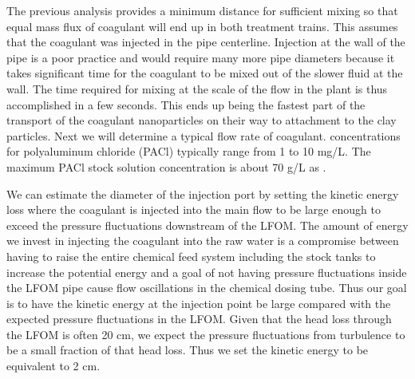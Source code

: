\documentclass[letterpaper,10pt,english]{sphinxmanual}
\begin{document}
The previous analysis provides a minimum distance for sufficient mixing so that equal mass flux of coagulant will end up in both treatment trains. This assumes that the coagulant was injected in the pipe centerline. Injection at the wall of the pipe is a poor practice and would require many more pipe diameters because it takes significant time for the coagulant to be mixed out of the slower fluid at the wall. The time required for mixing at the scale of the flow in the plant is thus accomplished in a few seconds. This ends up being the fastest part of the transport of the coagulant nanoparticles on their way to attachment to the clay particles.  Next we will determine a typical flow rate of coagulant.  concentrations for polyaluminum chloride (PACl) typically range from 1 to 10 mg/L. The maximum PACl stock solution concentration is about 70 g/L as .

%
\begin{sphinxVerbatim}[commandchars=\\\{\}]
   
    
  
\end{sphinxVerbatim}

We can estimate the diameter of the injection port by setting the kinetic energy loss where the coagulant is injected into the main flow to be large enough to exceed the pressure fluctuations downstream of the LFOM. The amount of energy we invest in injecting the coagulant into the raw water is a compromise between having to raise the entire chemical feed system including the stock tanks to increase the potential energy and a goal of not having pressure fluctuations inside the LFOM pipe cause flow oscillations in the chemical dosing tube. Thus our goal is to have the kinetic energy at the injection point be large compared with the expected pressure fluctuations in the LFOM. Given that the head loss through the LFOM is often 20 cm, we expect the pressure fluctuations from turbulence to be a small fraction of that head loss. Thus we set the kinetic energy to be equivalent to 2 cm.
\end{document}
